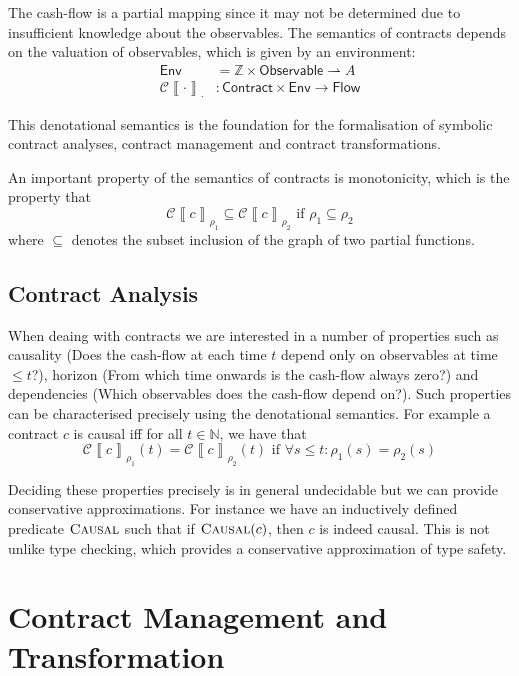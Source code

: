 \documentclass[a4paper,debug,twocolumn]{easychair}
\newcommand{\comm}[3][red]{{\small \color{#1}{$\spadesuit$#2: #3}}}
\newcommand{\pbcomment}[1]{\comm[green]{pb}{#1}}
\newcommand\type[1]{\mathsf{#1}}
\newcommand\nats{{\mathbb N}}
\newcommand\ints{{\mathbb Z}}
\newcommand\pto{\rightharpoonup}
\newcommand\cSem[2]{{\mathcal C}\left\llbracket#1\right\rrbracket_{#2}}
\newcommand\Pred[1]{\textsc{#1}}
\theoremstyle{plain}
\begin{document}
The cash-flow is a partial mapping since it may not be determined due
to insufficient knowledge about the observables. The semantics of
contracts depends on the valuation of observables, which is given by
an environment:
\begin{align*}
  \type{Env} &= \ints \times \type{Observable} \pto A\\
  \cSem{\cdot}{\cdot}&\colon \type{Contract} \times \type{Env} \to
  \type{Flow}
\end{align*}

This denotational semantics is the foundation for the formalisation of
symbolic contract analyses, contract management and contract
transformations.

An important property of the semantics of contracts is monotonicity,
which is the property that
\[
\cSem c {\rho_1} \subseteq \cSem c {\rho_2} \text{ if }
\rho_1\subseteq \rho_2
\]
where $\subseteq$ denotes the subset inclusion of the graph of two
partial functions.

\subsection{Contract Analysis}
\label{sec:contract-analysis}

When deaing with contracts we are interested in a number of properties
such as causality (Does the cash-flow at each time $t$ depend only on
observables at time $\leq t$?), horizon (From which time onwards is
the cash-flow always zero?) and dependencies (Which observables does
the cash-flow depend on?). Such properties can be characterised
precisely using the denotational semantics. For example a contract $c$
is causal iff for all $t \in \nats$, we have that
\[
\cSem c{\rho_1} (t) = \cSem c {\rho_2} (t) \text{ if } \forall s \le t\colon
\rho_1(s)=\rho_2(s)
\]


Deciding these properties precisely is in general undecidable but we
can provide conservative approximations.  For instance we have an
inductively defined predicate $\Pred{Causal}$ such that if
$\Pred{Causal}(c)$, then $c$ is indeed causal. This is not unlike type
checking, which provides a conservative approximation of type safety.


\section{Contract Management and Transformation}
\label{sec:contract-management}

\pbcomment{What do we precisely mean by contract management?}
\end{document}
